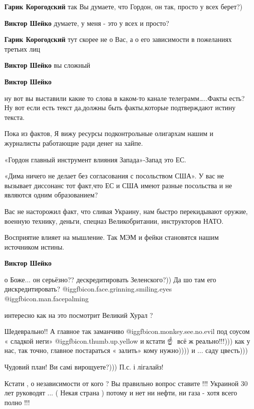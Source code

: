 \begin{itemize}
\begin{itemize}
\textbf{Гарик Корогодский} так Вы думаете, что Гордон, он так, просто у всех берет?)

\textbf{Виктор Шейко} думаете, у меня - это у всех и просто?

\textbf{Гарик Корогодский} тут скорее не о Вас, а о его зависимости в пожеланиях третьих лиц

\textbf{Виктор Шейко} вы сложный

\textbf{Виктор Шейко} 

ну вот вы выставили какие то слова в каком-то канале телеграмм…..Факты есть? Ну
вот если есть текст да,должны быть факты,которые подтверждают истину текста.

Пока из фактов, Я вижу ресурсы подконтрольные олигархам нашим и журналисты
работающие ради денег на хайпе.

«Гордон главный инструмент влияния Запада»-Запад это ЕС.

«Дима ничего не делает без согласования с посольством США». У вас не вызывает
диссонанс тот факт,что ЕС и США имеют разные посольства и не являются одним
образованием?

Вас не насторожил факт, что сливая Украину, нам быстро перекидывают оружие,
военную технику, деньги, спецназ Великобритании, инструкторов НАТО.🤷

Восприятие влияет на мышление.
Так МЭМ и фейки становятся нашим источником истины.

\textbf{Виктор Шейко} 

о Боже... он серьёзно?? дескредитировать Зеленского?)) Да шо там его
дискредитировать? @igg{fbicon.face.grinning.smiling.eyes}
@igg{fbicon.man.facepalming} 

интересно как на это посмотрит Великий Хурал ?
\end{itemize} %


Шедеврально!! А главное так заманчиво @igg{fbicon.monkey.see.no.evil} под соусом « сладкой неги»  @igg{fbicon.thumb.up.yellow} и
кстати ☝ ️ всё ж реально!!!))) как у нас, так точно, главное постараться « залить»
кому нужно)))) и ... саду цвесть)))


Чудовий план! Ви самі вирощуете?))) П.с. і лігалайз!


Кстати , о независимости от кого ? Вы правильно вопрос ставите !!! Украиной 30
лет руководят ... ( Некая страна ) потому и нет ни нефти, ни газа - хотя всего
полно !!!


\end{itemize}
